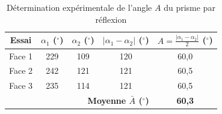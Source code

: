 \begin{table}[ht]
    \centering
    
    \begin{tabular}{|c|c|c|c|c|}
        \hline
        Essai & $\alpha_1$ ($^\circ$) & $\alpha_2$ ($^\circ$) & $|\alpha_1 - \alpha_2|$ ($^\circ$) & $A = \frac{|\alpha_1 - \alpha_2|}{2}$ ($^\circ$) \\
        \hline
        Face 1 & 229 & 109 & 120 & 60,0 \\
        Face 2 & 242 & 121 & 121 & 60,5 \\
        Face 3 & 235 & 114 & 121 & 60,5 \\
        \hline
        \multicolumn{4}{|r|}{\textbf{Moyenne $\bar{A}$ ($^\circ$)}} & \textbf{60,3} \\
        \hline
    \end{tabular}
    \label{tab:mesure_angle_A}
    \caption{Détermination expérimentale de l'angle $A$ du prisme par réflexion}
\end{table}